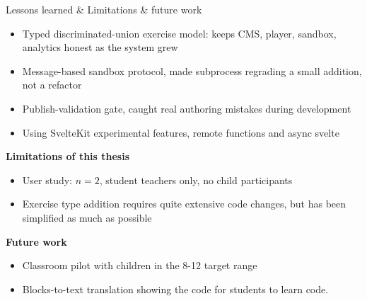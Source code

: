 \documentclass[11pt,t,usepdftitle=false,aspectratio=169]{beamer}
\begin{document}
\begin{frame}{Lessons learned \& Limitations \& future work}
  \begin{itemize}
    \item Typed discriminated-union exercise model: keeps CMS, player, sandbox,
          analytics honest as the system grew
    \item Message-based sandbox protocol, made subprocess regrading a small addition, not a refactor
    \item Publish-validation gate, caught real authoring mistakes during development
    \item Using SvelteKit experimental features, remote functions and async svelte
  \end{itemize}
  \vspace{0.2cm}
  \textbf{Limitations of this thesis}
  \begin{itemize}
    \item User study: $n = 2$, student teachers only, no child participants
    \item Exercise type addition requires quite extensive code changes, but has been simplified as much as possible
  \end{itemize}
  \vspace{0.2cm}
  \textbf{Future work}
  \begin{itemize}
    \item Classroom pilot with children in the 8-12 target range
    \item Blocks-to-text translation showing the code for students to learn code.
  \end{itemize}
\end{frame}

\end{document}
